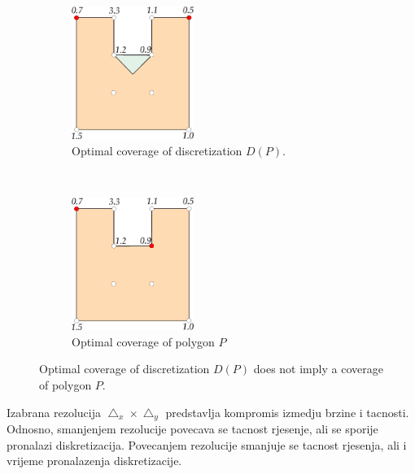 \documentclass[runningheads,a4paper]{elsarticle}
\begin{document}
	\begin{figure}[t!]
    	\centering
    	\begin{subfigure}[t]{0.49\textwidth}
        	\centering
        	\includegraphics[height=1.7in]{slika1a.eps}
        	\caption{Optimal coverage of discretization $D(P)$. }
    	\end{subfigure}%
    	~
    	\begin{subfigure}[t]{0.49\textwidth}
        	\centering
        	\includegraphics[height=1.7in]{slika1b.eps}
        	\caption{Optimal coverage of polygon $P$}
    	\end{subfigure}
    	\caption{Optimal coverage of discretization $D(P)$ does not imply a coverage of polygon $P$.}
	\end{figure}
	
	Izabrana rezolucija $\bigtriangleup_{x}\times\bigtriangleup_{y}$ predstavlja kompromis izmedju brzine i tacnosti. Odnosno, smanjenjem rezolucije povecava se tacnost rjesenje, ali se sporije pronalazi diskretizacija. Povecanjem rezolucije smanjuje se tacnost rjesenja, ali i vrijeme pronalazenja diskretizacije.
	
	
\end{document}
